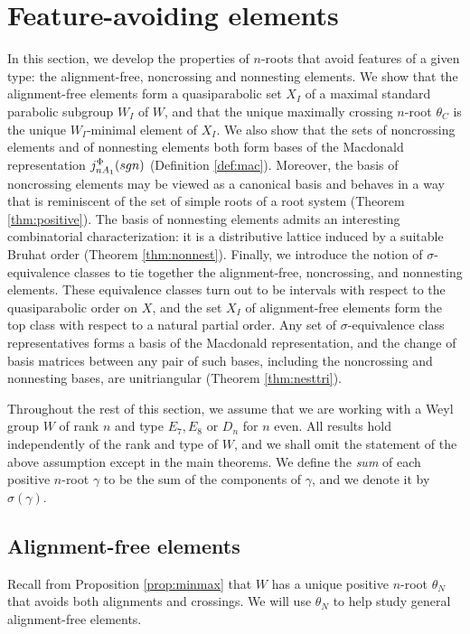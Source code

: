 \documentclass[11pt]{amsart}
\theoremstyle{plain}
\theoremstyle{definition}
\theoremstyle{remark}
\numberwithin{equation}{subsection}
\newcommand{\macd}[2]{j^{#1}_{#2}({\rm{sgn}})}
\begin{document}
\section{Feature-avoiding elements}\label{sec:non}
In this section, we develop the properties of $n$-roots that avoid
features of a given type: the alignment-free, noncrossing and nonnesting
elements.  We show that the alignment-free elements form a quasiparabolic set
$X_I$ of a maximal standard parabolic subgroup $W_I$ of $W$, and that the unique
maximally crossing $n$-root $\theta_C$ is the unique $W_I$-minimal
element of $X_I$.  We also show that the sets of noncrossing elements and of
nonnesting elements both form bases of the Macdonald representation 
$\macd{\Phi}{nA_1}$ (Definition \ref{def:mac}).  Moreover,
the basis of noncrossing elements may be viewed as a canonical basis and behaves
in a way that is reminiscent of the set of simple roots of a root system
(Theorem \ref{thm:positive}).  The basis of nonnesting elements admits an
interesting combinatorial characterization: it is a distributive lattice induced
by a suitable Bruhat order (Theorem \ref{thm:nonnest}). Finally, we introduce
the notion of $\sigma$-equivalence classes to tie together the alignment-free,
noncrossing, and nonnesting elements. These equivalence classes turn out to be
intervals with respect to the quasiparabolic order on $X$, and the set $X_I$ of
alignment-free elements form the top class with respect to a natural partial
order. Any set of $\sigma$-equivalence class representatives forms a basis of
the Macdonald representation, and the change of basis matrices between any pair
of such bases, including the noncrossing and nonnesting bases, are unitriangular
(Theorem \ref{thm:nesttri}).

Throughout the rest of this section, we assume that we are working with
a Weyl group $W$ of rank $n$ and type $E_7, E_8$ or $D_n$ for $n$ even. All
results hold independently of the rank and type of $W$, and we shall omit the
statement of the above assumption except in the main theorems. We define the
\emph{sum} of each positive $n$-root $\gamma$ to be the sum of the components of
$\gamma$, and we denote it by $\sigma(\gamma)$.

\subsection{Alignment-free elements}
Recall from Proposition \ref{prop:minmax} that $W$ has a unique positive
$n$-root $\theta_N$ that avoids both alignments and crossings. We will use
$\theta_N$ to help study general alignment-free elements.
\end{document}
